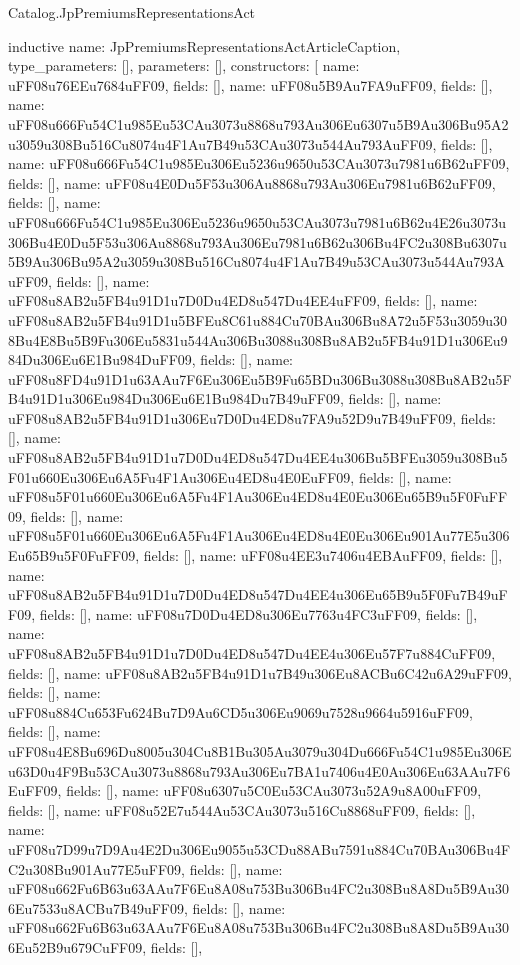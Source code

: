 \begin{lexlean}{Catalog.JpPremiumsRepresentationsAct}
\begin{semanticmodule}
inductive{
  name: JpPremiumsRepresentationsActArticleCaption,
  type_parameters: [],
  parameters: [],
  constructors: [
    {name: uFF08u76EEu7684uFF09, fields: []},
    {name: uFF08u5B9Au7FA9uFF09, fields: []},
    {name: uFF08u666Fu54C1u985Eu53CAu3073u8868u793Au306Eu6307u5B9Au306Bu95A2u3059u308Bu516Cu8074u4F1Au7B49u53CAu3073u544Au793AuFF09, fields: []},
    {name: uFF08u666Fu54C1u985Eu306Eu5236u9650u53CAu3073u7981u6B62uFF09, fields: []},
    {name: uFF08u4E0Du5F53u306Au8868u793Au306Eu7981u6B62uFF09, fields: []},
    {name: uFF08u666Fu54C1u985Eu306Eu5236u9650u53CAu3073u7981u6B62u4E26u3073u306Bu4E0Du5F53u306Au8868u793Au306Eu7981u6B62u306Bu4FC2u308Bu6307u5B9Au306Bu95A2u3059u308Bu516Cu8074u4F1Au7B49u53CAu3073u544Au793AuFF09, fields: []},
    {name: uFF08u8AB2u5FB4u91D1u7D0Du4ED8u547Du4EE4uFF09, fields: []},
    {name: uFF08u8AB2u5FB4u91D1u5BFEu8C61u884Cu70BAu306Bu8A72u5F53u3059u308Bu4E8Bu5B9Fu306Eu5831u544Au306Bu3088u308Bu8AB2u5FB4u91D1u306Eu984Du306Eu6E1Bu984DuFF09, fields: []},
    {name: uFF08u8FD4u91D1u63AAu7F6Eu306Eu5B9Fu65BDu306Bu3088u308Bu8AB2u5FB4u91D1u306Eu984Du306Eu6E1Bu984Du7B49uFF09, fields: []},
    {name: uFF08u8AB2u5FB4u91D1u306Eu7D0Du4ED8u7FA9u52D9u7B49uFF09, fields: []},
    {name: uFF08u8AB2u5FB4u91D1u7D0Du4ED8u547Du4EE4u306Bu5BFEu3059u308Bu5F01u660Eu306Eu6A5Fu4F1Au306Eu4ED8u4E0EuFF09, fields: []},
    {name: uFF08u5F01u660Eu306Eu6A5Fu4F1Au306Eu4ED8u4E0Eu306Eu65B9u5F0FuFF09, fields: []},
    {name: uFF08u5F01u660Eu306Eu6A5Fu4F1Au306Eu4ED8u4E0Eu306Eu901Au77E5u306Eu65B9u5F0FuFF09, fields: []},
    {name: uFF08u4EE3u7406u4EBAuFF09, fields: []},
    {name: uFF08u8AB2u5FB4u91D1u7D0Du4ED8u547Du4EE4u306Eu65B9u5F0Fu7B49uFF09, fields: []},
    {name: uFF08u7D0Du4ED8u306Eu7763u4FC3uFF09, fields: []},
    {name: uFF08u8AB2u5FB4u91D1u7D0Du4ED8u547Du4EE4u306Eu57F7u884CuFF09, fields: []},
    {name: uFF08u8AB2u5FB4u91D1u7B49u306Eu8ACBu6C42u6A29uFF09, fields: []},
    {name: uFF08u884Cu653Fu624Bu7D9Au6CD5u306Eu9069u7528u9664u5916uFF09, fields: []},
    {name: uFF08u4E8Bu696Du8005u304Cu8B1Bu305Au3079u304Du666Fu54C1u985Eu306Eu63D0u4F9Bu53CAu3073u8868u793Au306Eu7BA1u7406u4E0Au306Eu63AAu7F6EuFF09, fields: []},
    {name: uFF08u6307u5C0Eu53CAu3073u52A9u8A00uFF09, fields: []},
    {name: uFF08u52E7u544Au53CAu3073u516Cu8868uFF09, fields: []},
    {name: uFF08u7D99u7D9Au4E2Du306Eu9055u53CDu88ABu7591u884Cu70BAu306Bu4FC2u308Bu901Au77E5uFF09, fields: []},
    {name: uFF08u662Fu6B63u63AAu7F6Eu8A08u753Bu306Bu4FC2u308Bu8A8Du5B9Au306Eu7533u8ACBu7B49uFF09, fields: []},
    {name: uFF08u662Fu6B63u63AAu7F6Eu8A08u753Bu306Bu4FC2u308Bu8A8Du5B9Au306Eu52B9u679CuFF09, fields: []},
}
\end{semanticmodule}
\end{lexlean}
